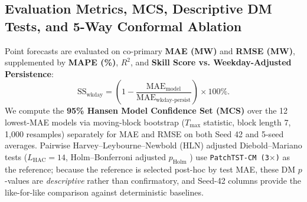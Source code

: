 \documentclass[5p,twocolumn,authoryear]{elsarticle}
\begin{document}
\subsection{Evaluation Metrics, MCS, Descriptive DM Tests, and 5-Way Conformal Ablation}
Point forecasts are evaluated on co-primary \textbf{MAE (MW)} and \textbf{RMSE (MW)}, supplemented by \textbf{MAPE (\%)}, $R^2$, and \textbf{Skill Score vs. Weekday-Adjusted Persistence}:
\begin{equation}
    \text{SS}_{\text{wkday}} = \left(1 - \frac{\text{MAE}_{\text{model}}}{\text{MAE}_{\text{wkday-persist}}}\right) \times 100\%.
\end{equation}
We compute the \textbf{95\% Hansen Model Confidence Set (MCS)} \citep{hansen2011mcs} over the 12 lowest-MAE models via moving-block bootstrap ($T_{\max}$ statistic, block length 7, 1,000 resamples) separately for MAE and RMSE on both Seed 42 and 5-seed averages. Pairwise Harvey--Leybourne--Newbold (HLN) adjusted Diebold--Mariano tests \citep{diebold1995dm,harvey1997testing} ($L_{\text{HAC}}=14$, Holm--Bonferroni adjusted $p_{\text{Holm}}$ \citep{holm1979simple}) use \texttt{PatchTST-CM (3$\times$)} as the reference; because the reference is selected post-hoc by test MAE, these DM $p$-values are \textit{descriptive} rather than confirmatory, and Seed-42 columns provide the like-for-like comparison against deterministic baselines.
\end{document}
